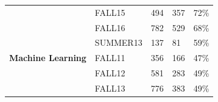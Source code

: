 \begin{table}[]
\begin{tabular}{lllll}
\textbf{}                                                                            & FALL15                                & 494                                                                                       & 357                                                                                        & 72\%                                                                                                  \\
\textbf{}                                                                            & FALL16                                & 782                                                                                       & 529                                                                                        & 68\%                                                                                                  \\
\textbf{}                                                                            & SUMMER13                              & 137                                                                                       & 81                                                                                         & 59\%                                                                                                  \\
\textbf{Machine Learning}                                                            & FALL11                                & 356                                                                                       & 166                                                                                        & 47\%                                                                                                  \\
\textbf{}                                                                            & FALL12                                & 581                                                                                       & 283                                                                                        & 49\%                                                                                                  \\
\textbf{}                                                                            & FALL13                                & 776                                                                                       & 383                                                                                        & 49\%                                                                                                  \\

\end{tabular}
\end{table}
